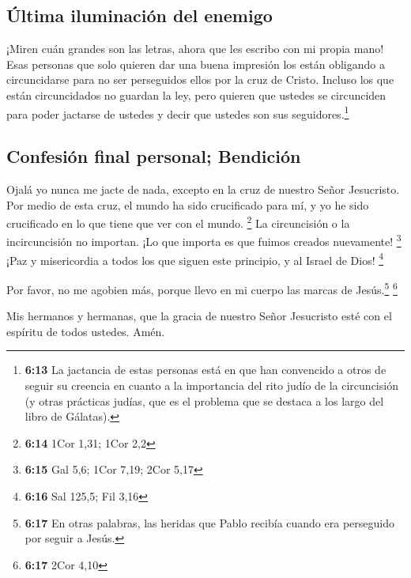 \hypertarget{uxfaltima-iluminaciuxf3n-del-enemigo}{%
\subsection{Última iluminación del
enemigo}\label{uxfaltima-iluminaciuxf3n-del-enemigo}}

 ¡Miren cuán grandes son las letras, ahora que les
escribo con mi propia mano!  Esas personas que solo
quieren dar una buena impresión los están obligando a circuncidarse para
no ser perseguidos ellos por la cruz de Cristo.  Incluso
los que están circuncidados no guardan la ley, pero quieren que ustedes
se circunciden para poder jactarse de ustedes y decir que ustedes son
sus seguidores.\footnote{\textbf{6:13} La jactancia de estas personas
  está en que han convencido a otros de seguir su creencia en cuanto a
  la importancia del rito judío de la circuncisión (y otras prácticas
  judías, que es el problema que se destaca a los largo del libro de
  Gálatas).}

\hypertarget{confesiuxf3n-final-personal-bendiciuxf3n}{%
\subsection{Confesión final personal;
Bendición}\label{confesiuxf3n-final-personal-bendiciuxf3n}}

 Ojalá yo nunca me jacte de nada, excepto en la cruz de
nuestro Señor Jesucristo. Por medio de esta cruz, el mundo ha sido
crucificado para mí, y yo he sido crucificado en lo que tiene que ver
con el mundo. \footnote{\textbf{6:14} 1Cor 1,31; 1Cor 2,2}
 La circuncisión o la incircuncisión no importan. ¡Lo que
importa es que fuimos creados nuevamente! \footnote{\textbf{6:15} Gal
  5,6; 1Cor 7,19; 2Cor 5,17}  ¡Paz y misericordia a todos
los que siguen este principio, y al Israel de Dios! \footnote{\textbf{6:16}
  Sal 125,5; Fil 3,16}

 Por favor, no me agobien más, porque llevo en mi cuerpo
las marcas de Jesús.\footnote{\textbf{6:17} En otras palabras, las
  heridas que Pablo recibía cuando era perseguido por seguir a Jesús.}
\footnote{\textbf{6:17} 2Cor 4,10}

 Mis hermanos y hermanas, que la gracia de nuestro Señor
Jesucristo esté con el espíritu de todos ustedes. Amén.
